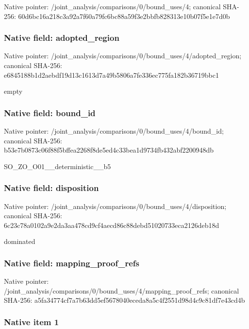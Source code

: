 \documentclass[10pt,a4paper]{article}
\begin{document}
Native pointer: /joint\_analysis/comparis\allowbreak{}ons/0/bound\_uses/4; canonical SHA-256: 60d6bc16a218c3a92a7f60a7\allowbreak{}9fc6bc88a59f3e2bbfb82831\allowbreak{}3e10b07f5e1e7d0b



\subsubsection{Native field: adopted\_region}


Native pointer: /joint\_analysis/comparis\allowbreak{}ons/0/bound\_uses/4/adopt\allowbreak{}ed\_region; canonical SHA-256: e6845188b1d2aebdf19d13c1\allowbreak{}613d7a49b5806a7fe336ec77\allowbreak{}5fa182b36719bbc1


empty


\subsubsection{Native field: bound\_id}


Native pointer: /joint\_analysis/comparis\allowbreak{}ons/0/bound\_uses/4/bound\allowbreak{}\_id; canonical SHA-256: b53e7b0873c06f88f5bffea2\allowbreak{}268f8de5ed4c33bea1d9734f\allowbreak{}b432abf2200948db


SO\_ZO\_O01\_\_deterministic\_\_b5


\subsubsection{Native field: disposition}


Native pointer: /joint\_analysis/comparis\allowbreak{}ons/0/bound\_uses/4/dispo\allowbreak{}sition; canonical SHA-256: 6c23c78a0102a9e2da3aa478\allowbreak{}cd9cf4aecd86c88debd51020\allowbreak{}733eca2126deb18d


dominated


\subsubsection{Native field: mapping\_proof\_refs}


Native pointer: /joint\_analysis/comparis\allowbreak{}ons/0/bound\_uses/4/mappi\allowbreak{}ng\_proof\_refs; canonical SHA-256: a5fa34774cf7a7b63dd5ef56\allowbreak{}78040eceda8a5c4f2551d98d\allowbreak{}4c9c81df7e43cd4b



\subsubsection{Native item 1}
\end{document}
